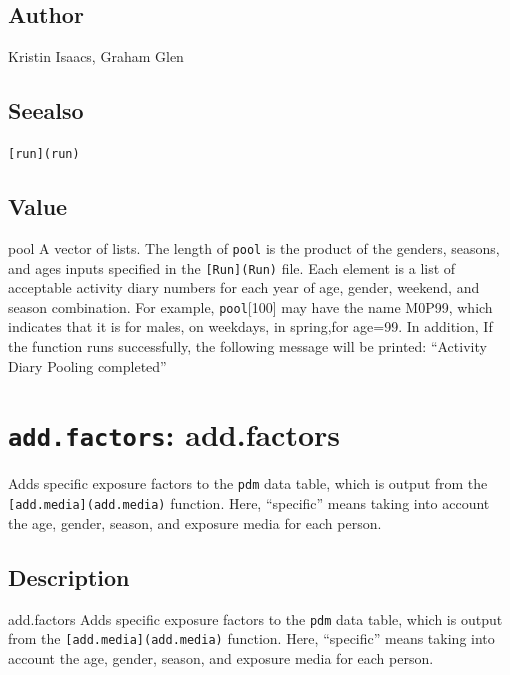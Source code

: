 \documentclass[
]{article}
\begin{document}
\hypertarget{author}{%
\subsection{Author}\label{author}}

Kristin Isaacs, Graham Glen

\hypertarget{seealso}{%
\subsection{Seealso}\label{seealso}}

\texttt{{[}run{]}(run)}

\hypertarget{value}{%
\subsection{Value}\label{value}}

pool A vector of lists. The length of \texttt{pool} is the product of
the genders, seasons, and ages inputs specified in the
\texttt{{[}Run{]}(Run)} file. Each element is a list of acceptable
activity diary numbers for each year of age, gender, weekend, and season
combination. For example, \texttt{pool}{[}100{]} may have the name
M0P99, which indicates that it is for males, on weekdays, in spring,for
age=99. In addition, If the function runs successfully, the following
message will be printed: ``Activity Diary Pooling completed''

\hypertarget{add.factors-add.factors}{%
\section{\texorpdfstring{\texttt{add.factors}:
add.factors}{add.factors: add.factors}}\label{add.factors-add.factors}}

Adds specific exposure factors to the \texttt{pdm} data table, which is
output from the \texttt{{[}add.media{]}(add.media)} function. Here,
``specific'' means taking into account the age, gender, season, and
exposure media for each person.

\hypertarget{description-2}{%
\subsection{Description}\label{description-2}}

add.factors Adds specific exposure factors to the \texttt{pdm} data
table, which is output from the \texttt{{[}add.media{]}(add.media)}
function. Here, ``specific'' means taking into account the age, gender,
season, and exposure media for each person.
\end{document}

